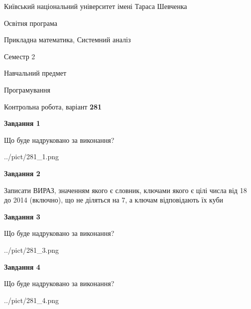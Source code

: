 \documentclass[12pt, ukrainian]{article}
\begin{document}
{{\begin {small}\par
{ \center  Київський національний університет імені Тараса Шевченка \par}
{\parbox {5 cm}{Освітня програма \hfill}{\parbox {8 cm}{Прикладна математика, Системний аналіз \hfill}}\parbox {5 cm}{\hfill Семестр 2}}\par
{\parbox {5 cm} {Навчальний предмет \hfill}\parbox {7 cm}{Програмування \hfill}\parbox {6cm}{\hfill}\par}\vspace{-7pt} \end{small}}{\center Контрольна робота, варіант  \No \textbf
{ 281 }\par}}
{
\begin {large}
{\begin {center}\textbf{Завдання 1}\end {center}}\par
Що буде надруковано за виконання?\par\par
\begin{center}
	{../pict/281_1.png}
\end{center}
\newpage

{\begin {center}\textbf{Завдання 2}\end {center}}\par
Записати ВИРАЗ, значенням якого є словник, ключами якого є цілі числа від 18 до 2014 (включно), що не діляться на 7, а ключам відповідають їх куби\par
\newpage

{\begin {center}\textbf{Завдання 3}\end {center}}\par
Що буде надруковано за виконання?
\begin{center}
	{../pict/281_3.png}
\end{center}
\newpage

{\begin {center}\textbf{Завдання 4}\end {center}}\par
Що буде надруковано за виконання?\par
\begin{center}
	{../pict/281_4.png}
\end{center}
\newpage


\end{large}}
\end{document}

